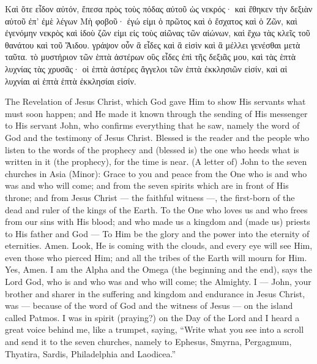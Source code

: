 \begin{pages}
\begin{Rightside}
		\pend
		\pstart
			Καὶ ὅτε εἶδον αὐτόν, ἔπεσα πρὸς τοὺς πόδας αὐτοῦ ὡς νεκρός· καὶ ἔθηκεν τὴν δεξιὰν αὐτοῦ ἐπ’ ἐμὲ λέγων Μὴ φοβοῦ· ἐγώ εἰμι ὁ πρῶτος καὶ ὁ ἔσχατος καὶ ὁ Ζῶν, καὶ ἐγενόμην νεκρὸς καὶ ἰδοὺ ζῶν εἰμι εἰς τοὺς αἰῶνας τῶν αἰώνων, καὶ ἔχω τὰς κλεῖς τοῦ θανάτου καὶ τοῦ Ἅιδου. γράψον οὖν ἃ εἶδες καὶ ἃ εἰσὶν καὶ ἃ μέλλει γενέσθαι μετὰ ταῦτα. τὸ μυστήριον τῶν ἑπτὰ ἀστέρων οὓς εἶδες ἐπὶ τῆς δεξιᾶς μου, καὶ τὰς ἑπτὰ λυχνίας τὰς χρυσᾶς· οἱ ἑπτὰ ἀστέρες ἄγγελοι τῶν ἑπτὰ ἐκκλησιῶν εἰσίν, καὶ αἱ λυχνίαι αἱ ἑπτὰ ἑπτὰ ἐκκλησίαι εἰσίν.
		\pend
        \endnumbering
    \end{Rightside}
    \begin{Leftside}
        \beginnumbering
			The Revelation of Jesus Christ, which God gave Him to show His servants what must soon happen; and He made it known through the sending of His messenger to His servant John, who confirms everything that he saw, namely the word of God and the testimony of Jesus Christ. Blessed is the reader and the people who listen to the words of the prophecy and (blessed is) the one who heeds what is written in it (the prophecy), for the time is near.
		\pend
		\pstart
			(A letter of) John to the seven churches in Asia (Minor): Grace to you and peace from the One who is and who was and who will come; and from the seven spirits which are in front of His throne; and from Jesus Christ — the faithful witness —, the first-born of the dead and ruler of the kings of the Earth.
		\pend
		\pstart
			To the One who loves us and who frees from our sins with His blood; and who made us a kingdom and (made us) priests to His father and God — To Him be the glory and the power into the eternity of eternities. Amen.
		\pend
		\pstart
			Look, He is coming with the clouds, and every eye will see Him, even those who pierced Him; and all the tribes of the Earth will mourn for Him. Yes, Amen.
		\pend
		\pstart
			I am the Alpha and the Omega (the beginning and the end), says the Lord God, who is and who was and who will come; the Almighty.
		\pend
		\pstart
			I — John, your brother and sharer in the suffering and kingdom and endurance in Jesus Christ, was — because of the word of God and the witness of Jesus — on the island called Patmos. I was in spirit (praying?) on the Day of the Lord and I heard a great voice behind me, like a trumpet, saying, “Write what you see into a scroll and send it to the seven churches, namely to Ephesus, Smyrna, Pergagmum, Thyatira, Sardis, Philadelphia and Laodicea.”

\end{Leftside}
\end{pages}
